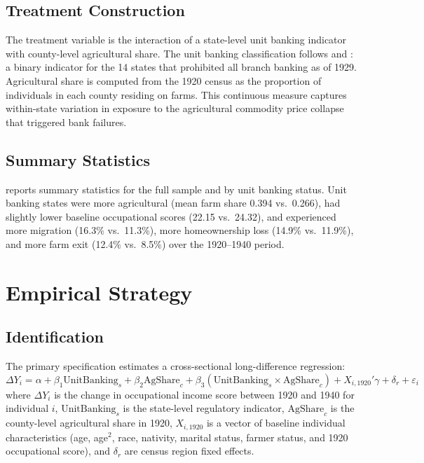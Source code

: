 \documentclass[12pt]{article}
\begin{document}
\subsection{Treatment Construction}

The treatment variable is the interaction of a state-level unit banking indicator with county-level agricultural share. The unit banking classification follows \citet{calomiris2014} and \citet{wheelock1995}: a binary indicator for the 14 states that prohibited all branch banking as of 1929. Agricultural share is computed from the 1920 census as the proportion of individuals in each county residing on farms. This continuous measure captures within-state variation in exposure to the agricultural commodity price collapse that triggered bank failures.

\subsection{Summary Statistics}

 reports summary statistics for the full sample and by unit banking status. Unit banking states were more agricultural (mean farm share 0.394 vs.\ 0.266), had slightly lower baseline occupational scores (22.15 vs.\ 24.32), and experienced more migration (16.3\% vs.\ 11.3\%), more homeownership loss (14.9\% vs.\ 11.9\%), and more farm exit (12.4\% vs.\ 8.5\%) over the 1920--1940 period.




\section{Empirical Strategy}
\label{sec:strategy}

\subsection{Identification}

The primary specification estimates a cross-sectional long-difference regression:
\begin{equation}
\Delta Y_i = \alpha + \beta_1 \text{UnitBanking}_s + \beta_2 \text{AgShare}_{c} + \beta_3 (\text{UnitBanking}_s \times \text{AgShare}_{c}) + X_{i,1920}' \gamma + \delta_r + \varepsilon_i
\label{eq:main}
\end{equation}
where $\Delta Y_i$ is the change in occupational income score between 1920 and 1940 for individual $i$, $\text{UnitBanking}_s$ is the state-level regulatory indicator, $\text{AgShare}_c$ is the county-level agricultural share in 1920, $X_{i,1920}$ is a vector of baseline individual characteristics (age, age$^2$, race, nativity, marital status, farmer status, and 1920 occupational score), and $\delta_r$ are census region fixed effects.
\end{document}
